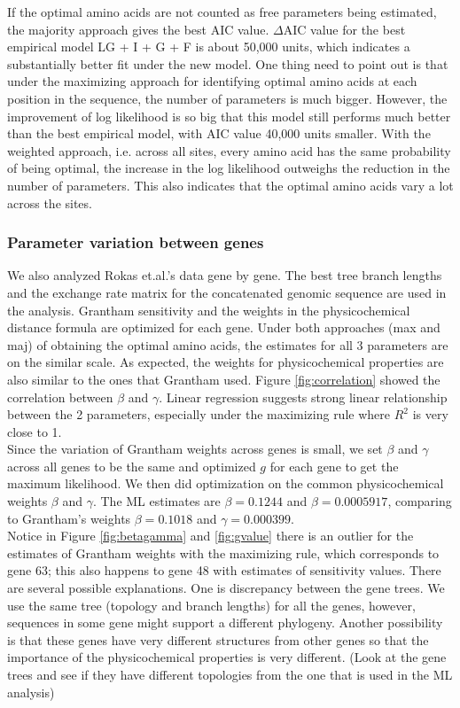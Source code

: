 \documentclass[13pt]{article}
\begin{document}
If the optimal amino acids are not counted as free parameters being estimated, the majority approach gives the best AIC value. $\Delta$AIC value for the best empirical model LG + I + G + F is about 50,000 units, which indicates a substantially better fit under the new model.
One thing need to point out is that under the maximizing approach for identifying optimal amino acids at each position in the sequence, the number of parameters is much bigger.
However, the improvement of log likelihood is so big that this model still performs much better than the best empirical model, with AIC value 40,000 units smaller.
With the weighted approach, i.e. across all sites, every amino acid has the same probability of being optimal, the increase in the log likelihood outweighs the reduction in the number of parameters.
This also indicates that the optimal amino acids vary a lot across the sites.  

\subsubsection{Parameter variation between genes}
We also analyzed Rokas et.al.'s data gene by gene.
The best tree branch lengths  and the exchange rate matrix for the concatenated genomic sequence are used in the analysis.
Grantham sensitivity and the weights in the physicochemical distance formula are optimized for each gene.
Under both approaches  (max and maj) of obtaining the optimal amino acids, the estimates for all 3 parameters are on the similar scale.
As expected, the weights for physicochemical properties are also similar to the ones that Grantham used.
Figure \ref{fig:correlation} showed the correlation between $\beta$ and $\gamma$.
Linear regression suggests strong linear relationship between the 2 parameters, especially under the maximizing rule where $R^2$ is very close to 1.\\

Since the variation of Grantham weights across genes is small, we set $\beta$ and $\gamma$ across all genes to be the same and optimized $g$ for each gene to get the maximum likelihood.
We then did optimization on the common physicochemical weights $\beta$ and $\gamma$.
The ML estimates are $\beta = 0.1244$ and $\beta = 0.0005917$, comparing to Grantham's weights $\beta = 0.1018$ and $\gamma = 0.000399$.\\

Notice in Figure \ref{fig:betagamma} and \ref{fig:gvalue}  there is an outlier for the estimates of Grantham weights with the maximizing rule, which corresponds to gene 63; this also happens to gene 48 with estimates of sensitivity values.
There are several possible explanations.
One is discrepancy between the gene trees.
We use the same tree (topology and branch lengths) for all the genes, however, sequences in some gene might support a different phylogeny.
Another possibility is that these genes have very different structures from other genes so that the importance of the physicochemical properties is very different. (Look at the gene trees and see if they have different topologies from the one that is used in the ML analysis)\\
\end{document}
